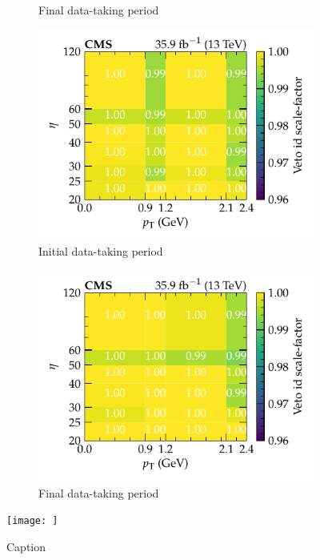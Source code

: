 \begin{figure}[htbp]
\begin{subfigure}[b]{0.49\textwidth}
        \caption{Final data-taking period}
        \label{subfigb:muon-id-scale-factors}
    \end{subfigure}
    \begin{subfigure}[b]{0.49\textwidth}
        \centering
        \includegraphics{chapters/041_corrections/images/efficiencies/objects/muons/muon_id_loose_runbf.pdf}
        \caption{Initial data-taking period}
        \label{subfiga:muon-id-scale-factors}
    \end{subfigure}
    \begin{subfigure}[b]{0.49\textwidth}
        \centering
        \includegraphics{chapters/041_corrections/images/efficiencies/objects/muons/muon_id_loose_rungh.pdf}
        \caption{Final data-taking period}
        \label{subfigb:muon-id-scale-factors}
    \end{subfigure}
    \texttt{[image: ]}
    \caption{Caption}
    \label{fig:muon-id-scale-factors}
\end{figure}


